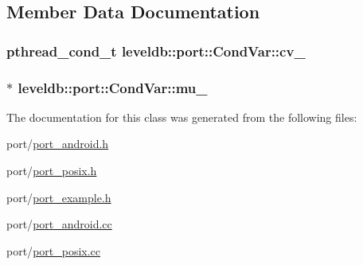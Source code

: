\subsection{Member Data Documentation}
\hypertarget{classleveldb_1_1port_1_1_cond_var_a371cf7e27428abc9552a569e027589b0}{}
\subsubsection[{cv\+\_\+}]{\setlength{\rightskip}{0pt plus 5cm}pthread\+\_\+cond\+\_\+t leveldb\+::port\+::\+Cond\+Var\+::cv\+\_\+\hspace{0.3cm}{\ttfamily [private]}}\label{classleveldb_1_1port_1_1_cond_var_a371cf7e27428abc9552a569e027589b0}
\hypertarget{classleveldb_1_1port_1_1_cond_var_a94b8651b71b9a71cddf0248a5944832a}{}
\subsubsection[{mu\+\_\+}]{ $\ast$ leveldb\+::port\+::\+Cond\+Var\+::mu\+\_\+\hspace{0.3cm}{\ttfamily [private]}}\label{classleveldb_1_1port_1_1_cond_var_a94b8651b71b9a71cddf0248a5944832a}


The documentation for this class was generated from the following files\+:\begin{DoxyCompactItemize}
\item 
port/\hyperlink{port__android_8h}{port\+\_\+android.\+h}\item 
port/\hyperlink{port__posix_8h}{port\+\_\+posix.\+h}\item 
port/\hyperlink{port__example_8h}{port\+\_\+example.\+h}\item 
port/\hyperlink{port__android_8cc}{port\+\_\+android.\+cc}\item 
port/\hyperlink{port__posix_8cc}{port\+\_\+posix.\+cc}\end{DoxyCompactItemize}
